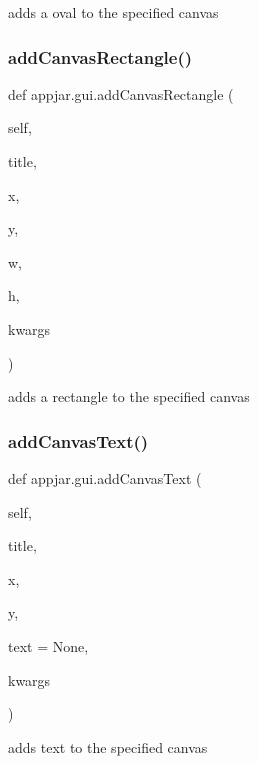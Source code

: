 \begin{DoxyVerb}adds a oval to the specified canvas \end{DoxyVerb}
 \mbox{\label{classappjar_1_1gui_ac989d3dfc3a89144b21692dc55fb9337}} 
\subsubsection{\texorpdfstring{add\+Canvas\+Rectangle()}{addCanvasRectangle()}}
{\footnotesize\ttfamily def appjar.\+gui.\+add\+Canvas\+Rectangle (\begin{DoxyParamCaption}\item[{}]{self,  }\item[{}]{title,  }\item[{}]{x,  }\item[{}]{y,  }\item[{}]{w,  }\item[{}]{h,  }\item[{}]{kwargs }\end{DoxyParamCaption})}

\begin{DoxyVerb}adds a rectangle to the specified canvas \end{DoxyVerb}
 \mbox{\label{classappjar_1_1gui_ad5e036e4776596fafc526c644f35e530}} 
\subsubsection{\texorpdfstring{add\+Canvas\+Text()}{addCanvasText()}}
{\footnotesize\ttfamily def appjar.\+gui.\+add\+Canvas\+Text (\begin{DoxyParamCaption}\item[{}]{self,  }\item[{}]{title,  }\item[{}]{x,  }\item[{}]{y,  }\item[{}]{text = {\ttfamily None},  }\item[{}]{kwargs }\end{DoxyParamCaption})}

\begin{DoxyVerb}adds text to the specified canvas \end{DoxyVerb}
 \mbox{\label{classappjar_1_1gui_a65dadc504c218227cf826fccaa795b89}} 
